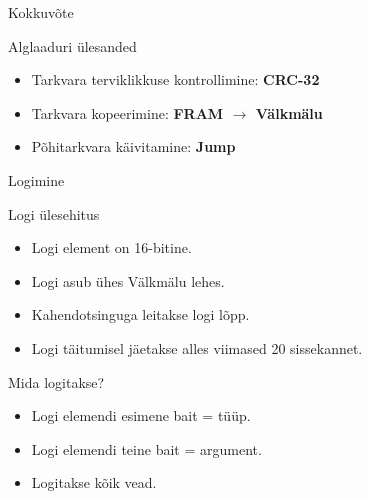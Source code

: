 \documentclass[pdf]{beamer}
\begin{document}
\begin{frame}{Kokkuvõte}
    \begin{block}{Alglaaduri ülesanded}
        \begin{itemize}
            \item Tarkvara terviklikkuse kontrollimine: \textbf{CRC-32}
            \item Tarkvara kopeerimine: \textbf{FRAM \(\to\) Välkmälu}
            \item Põhitarkvara käivitamine: \textbf{Jump}
        \end{itemize}
    \end{block}
\end{frame}

\begin{frame}{Logimine}
    \begin{block}{Logi ülesehitus}
        \begin{itemize}
            \item Logi element on 16-bitine.
            \item Logi asub ühes Välkmälu lehes.
            \item Kahendotsinguga leitakse logi lõpp.
            \item Logi täitumisel jäetakse alles viimased 20 sissekannet.
        \end{itemize}
    \end{block}
    \begin{block}{Mida logitakse?}
        \begin{itemize}
            \item Logi elemendi esimene bait = tüüp.
            \item Logi elemendi teine bait = argument.
            \item Logitakse kõik vead.
        \end{itemize}
    \end{block}
\end{frame}
\end{document}
